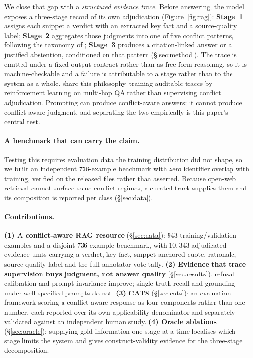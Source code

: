 \documentclass[11pt]{article}
\begin{document}
We close that gap with a \emph{structured evidence trace}. Before answering, the
model exposes a three-stage record of its own adjudication
(Figure~\ref{fig:rag}): \textbf{Stage~1} assigns each snippet a verdict with an
extracted key fact and a source-quality label; \textbf{Stage~2} aggregates those
judgments into one of five conflict patterns, following the taxonomy of
\citet{cattan2025dragged}; \textbf{Stage~3} produces a citation-linked answer or
a justified abstention, conditioned on that pattern (\S\ref{sec:method}). The
trace is emitted under a fixed output contract rather than as free-form
reasoning, so it is machine-checkable and a failure is attributable to a stage
rather than to the system as a whole. \citet{liu2026craft} share this philosophy,
training auditable traces by reinforcement learning on multi-hop QA rather than
supervising conflict adjudication. Prompting can produce conflict-aware answers; it cannot produce
conflict-aware judgment, and separating the two empirically is this paper's
central test.

\paragraph{A benchmark that can carry the claim.} Testing this requires evaluation data the training distribution did not shape, so
we built an independent 736-example benchmark with \emph{zero} identifier overlap
with training, verified on the released files rather than asserted. Because
open-web retrieval cannot surface some conflict regimes, a curated track supplies
them and its composition is reported per class (\S\ref{sec:data}).

\paragraph{Contributions.} \textbf{(1) A conflict-aware RAG resource}
(\S\ref{sec:data}): 943 training/validation examples and a disjoint 736-example
benchmark, with $10{,}343$ adjudicated evidence units carrying a verdict, key
fact, snippet-anchored quote, rationale, source-quality label and the full
annotator vote tally. \textbf{(2) Evidence that trace supervision buys judgment,
not answer quality} (\S\ref{sec:results}): refusal calibration and
prompt-invariance improve; single-truth recall and grounding under
well-specified prompts do not. \textbf{(3) CATS} (\S\ref{sec:cats}): an
evaluation framework scoring a conflict-aware response as four components rather
than one number, each reported over its own applicability denominator and
separately validated against an independent human study. \textbf{(4) Oracle
ablations} (\S\ref{sec:oracle}): supplying gold information one stage at a time
localises which stage limits the system and gives construct-validity evidence for
the three-stage decomposition.
\end{document}
